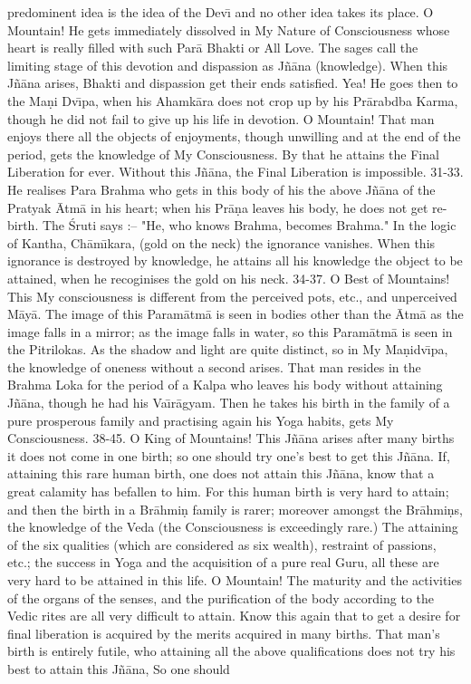 predominent idea is the idea of the Dev\={\i} and no other idea takes its place. O Mountain! He gets immediately dissolved in My Nature of Consciousness whose heart is really filled with such Par\=a Bhakti or All Love. The sages call the limiting stage of this devotion and dispassion as J\~n\=ana (knowledge). When this J\~n\=ana arises, Bhakti and dispassion get their ends satisfied. Yea! He goes then to the Ma\d{n}i Dv\={\i}pa, when his Ahamk\=ara does not crop up by his Pr\=arabdba Karma, though he did not fail to give up his life in devotion. O Mountain! That man enjoys there all the objects of enjoyments, though unwilling and at the end of the period, gets the knowledge of My Consciousness. By that he attains the Final Liberation for ever. Without this J\~n\=ana, the Final Liberation is impossible.
31-33. He realises Para Brahma who gets in this body of his the above J\~n\=ana of the Pratyak \=Atm\=a in his heart; when his Pr\=a\d{n}a leaves his body, he does not get re-birth. The \'Sruti says :-- "He, who knows Brahma, becomes Brahma." In the logic of Kantha, Ch\=am\={\i}kara, (gold on the neck) the ignorance vanishes. When this ignorance is destroyed by knowledge, he attains all his knowledge the object to be attained, when he recoginises the gold on his neck.
34-37. O Best of Mountains! This My consciousness is different from the perceived pots, etc., and unperceived M\=ay\=a. The image of this Param\=atm\=a is seen in bodies other than the \=Atm\=a as the image falls in a mirror; as the image falls in water, so this Param\=atm\=a is seen in the Pitrilokas. As the shadow and light are quite distinct, so in My Ma\d{n}idv\={\i}pa, the knowledge of oneness without a second arises. That man resides in the Brahma Loka for the period of a Kalpa who leaves his body without attaining J\~n\=ana, though he had his Va\={\i}r\=agyam. Then he takes his birth in the family of a pure prosperous family and practising again his Yoga habits, gets My Consciousness.
38-45. O King of Mountains! This J\~n\=ana arises after many births it does not come in one birth; so one should try one's best to get this J\~n\=ana. If, attaining this rare human birth, one does not attain this J\~n\=ana, know that a great calamity has befallen to him. For this human birth is very hard to attain; and then the birth in a Br\=ahmi\d{n} family is rarer; moreover amongst the Br\=ahmi\d{n}s, the knowledge of the Veda (the Consciousness is exceedingly rare.) The attaining of the six qualities (which are considered as six wealth), restraint of passions, etc.; the success in Yoga and the acquisition of a pure real Guru, all these are very hard to be attained in this life. O Mountain! The maturity and the activities of the organs of the senses, and the purification of the body according to the Vedic rites are all very difficult to attain. Know this again that to get a desire for final liberation is acquired by the merits acquired in many births. That man's birth is entirely futile, who attaining all the above qualifications does not try his best to attain this J\~n\=ana, So one should


